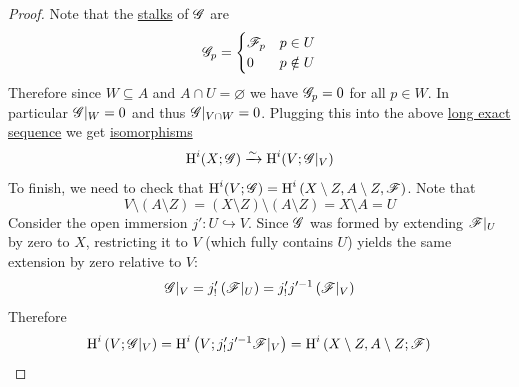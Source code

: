 \documentclass[../../main]{subfiles}
\begin{document}
\begin{proof}
  Note that the \hyperref[def:stalk]{stalks} of \(\mathscr{G}\) are
  \begin{equation*}
    \mathscr{G}_{p} = \begin{cases}
      \mathscr{F}_{p} & p \in U \\
      0 & p \notin U
    \end{cases}
  \end{equation*}
  Therefore since \(W \subseteq A\) and \(A \cap U = \varnothing\) we have \(\mathscr{G}_{p} = 0\) for all \(p \in W\).
  In particular \(\mathscr{G}|_{W} = 0\) and thus \(\mathscr{G}|_{V \cap W} = 0\).
  Plugging this into the above \hyperref[def:exact-sequence]{long exact sequence} we get \hyperref[def:categorical-isomorphism]{isomorphisms}
  \begin{equation*}
    \operatorname{H}^{i}(X; \mathscr{G}) \xrightarrow{\sim} \operatorname{H}^{i}(V; \mathscr{G}|_{V})
  \end{equation*}
  To finish, we need to check that \(\operatorname{H}^{i}(V; \mathscr{G}) = \operatorname{H}^{i} \left( X \setminus Z, A \setminus Z, \mathscr{F} \right)\).
  Note that
  \begin{equation*}
    V \setminus ( A \setminus Z ) = \left( X \setminus Z \right) \setminus \left( A \setminus Z \right) = X \setminus A = U
  \end{equation*}
  Consider the open immersion \(j'\colon U \hookrightarrow V\).
  Since \(\mathscr{G}\) was formed by extending \(\mathscr{F}|_{U}\) by zero to \(X\), restricting it to \(V\) (which fully contains \(U\)) yields the same extension by zero relative to \(V\):
  \begin{equation*}
    \mathscr{G}|_{V} = j'_{!} \left( \mathscr{F}|_{U} \right) = j'_{!} j'^{-1} \left( \mathscr{F}|_{V} \right)
  \end{equation*}
  Therefore
  \begin{equation*}
    \operatorname{H}^{i} \left( V; \mathscr{G}|_{V} \right) = \operatorname{H}^{i} \left( V; j'_{!}j'^{-1}\mathscr{F}|_{V} \right) = \operatorname{H}^{i} \left( X \setminus Z, A \setminus Z; \mathscr{F} \right) \qedhere
  \end{equation*}
\end{proof}
\end{document}
